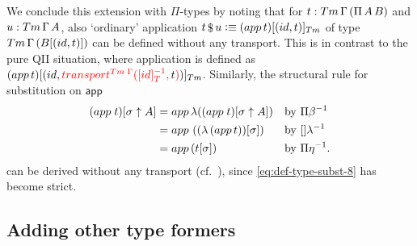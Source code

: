 \documentclass[a4paper,UKenglish,numberwithinsect,cleveref,thm-restate]{lipics-v2021}
\begin{document}
We conclude this extension with $\Pi$-types by noting that for $t : \Tm\,\Gamma\,(\Pi\,A\,B)$ and $u : \Tm\,\Gamma\,A$, also `ordinary' application
$t \mathop{\$} u \defeq \subTm{(\mathsf{app}\,t)}{(\idS , t)}$ of type $\Tm\,\Gamma\,(\sub{B}{(\idS , t)})$ can be defined without any transport. This is in contrast to the pure QII situation, where application is defined as $\subTm{(\mathsf{app}\,t)}{(\idS, \alert{\transfib{\Tm\;\Gamma}{[id]_T^{-1}}{\color{black}t}})}$.
%
Similarly, the structural rule for substitution on $\mathsf{app}$
\begin{align*}
  \sub{(\mathsf{app}\;t)}{\sigma \uparrow A} & = \mathsf{app}\,\lambda(\sub{(\mathsf{app}\;t)}{\sigma \uparrow A}) && \text{by $\Pi\beta^{-1}$} \\
                                              & = \mathsf{app}\,\left(\sub{(\lambda\,(\mathsf{app}\,t))}{\sigma}\right) && \text{by $[]\lambda^{-1}$} \\
                                              & = \mathsf{app}\,(\sub{t}{\sigma}) && \text{by $\Pi\eta^{-1}$.}
\end{align*}
can be derived without any transport (cf.\ \cite{Altenkirch2016a}), since \eqref{eq:def-type-subst-8} has become strict. 


\subsection{Adding other type formers} \label{subsec:SC+U+Pi+more}
\end{document}
